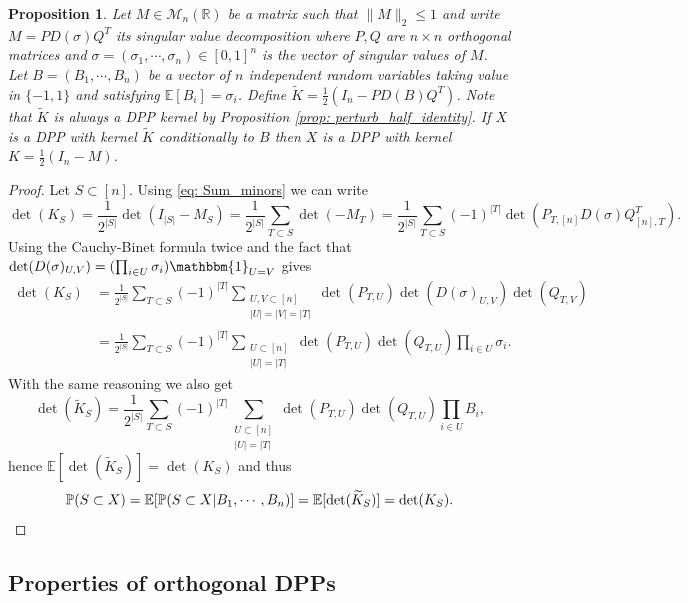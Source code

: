 \documentclass{article}
\numberwithin{equation}{section}
\renewcommand{\leq}{\leqslant}
\renewcommand{\tilde}{\widetilde}
\newcommand{\bE}{\mathbb{E}}
\newcommand{\bR}{\mathbb{R}}
\newcommand{\cara}[1]{\mathbbm{1}_{#1}}
\theoremstyle{plain}
\newtheorem{proposition}{Proposition}[section]
\begin{document}
\begin{proposition} \label{prop: bad_mixing}
Let $M\in\mathcal{M}_n(\bR)$ be a matrix such that $\|M\|_2\leq 1$ and write $M=PD(\sigma)Q^T$ its singular value decomposition where $P,Q$ are $n\times n$ orthogonal matrices and $\sigma=(\sigma_1,\cdots,\sigma_n)\in[0,1]^n$ is the vector of singular values of $M$. Let $B=(B_1,\cdots,B_n)$ be a vector of $n$ independent random variables taking value in $\{-1, 1\}$ and satisfying $\bE[B_i]=\sigma_i$. Define $\tilde K = \frac{1}{2}(I_n - PD(B)Q^T)$. Note that $\tilde K$ is always a DPP kernel by Proposition \ref{prop: perturb_half_identity}. If $X$ is a DPP with kernel $\tilde K$ conditionally to $B$ then $X$ is a DPP with kernel $K=\frac{1}{2}(I_n - M)$.
\end{proposition}
\begin{proof}
Let $S\subset [n]$. Using \eqref{eq: Sum_minors} we can write
$$\det(K_S)=\frac{1}{2^{|S|}}\det(I_{|S|} - M_S)=\frac{1}{2^{|S|}}\sum_{T\subset S}\det(-M_T)=\frac{1}{2^{|S|}}\sum_{T\subset S}(-1)^{|T|}\det(P_{T, [n]}D(\sigma)Q_{[n], T}^T).$$
Using the Cauchy-Binet formula twice and the fact that $\det(D(\sigma)_{U,V})=(\prod_{i\in U}\sigma_i)\cara{U=V}$ gives 
\begin{align*}
\det(K_S)&=\frac{1}{2^{|S|}}\sum_{T\subset S}(-1)^{|T|}\sum_{\substack{U,V\subset [n]\\ |U|=|V|=|T|}}\det(P_{T,U})\det(D(\sigma)_{U,V})\det(Q_{T, V})\\
&=\frac{1}{2^{|S|}}\sum_{T\subset S}(-1)^{|T|}\sum_{\substack{U\subset [n]\\ |U|=|T|}}\det(P_{T,U})\det(Q_{T, U})\prod_{i\in U}\sigma_i.
\end{align*}
With the same reasoning we also get
\[\det(\tilde K_S)=\frac{1}{2^{|S|}}\sum_{T\subset S}(-1)^{|T|}\sum_{\substack{U\subset [n]\\ |U|=|T|}}\det(P_{T, U})\det(Q_{T, U})\prod_{i\in U}B_i,\]
hence $\bE[\det(\tilde K_S)]=\det(K_S)$ and thus
\begin{equation*}
\mathbb{P}(S\subset X)=\bE[\mathbb{P}(S\subset X| B_1,\cdots, B_n)]=\bE[\det(\tilde K_S)]=\det(K_S).\qedhere
\end{equation*}
\end{proof}

\subsection{Properties of orthogonal DPPs}
\end{document}
